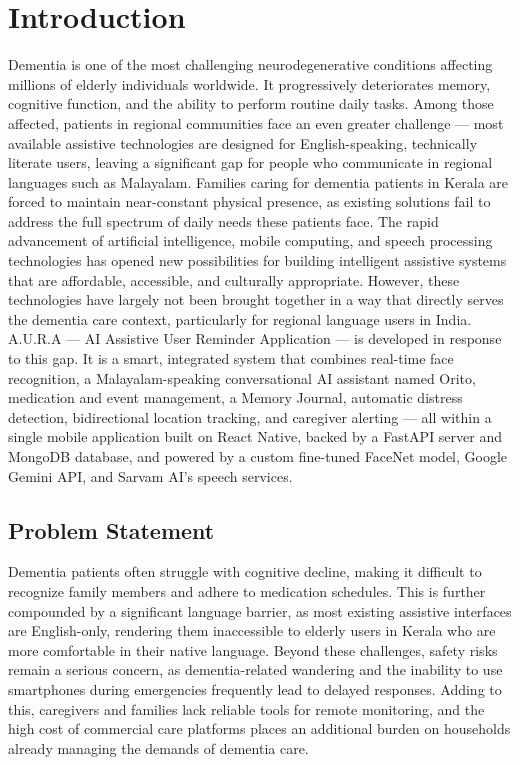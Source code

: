  \setcounter{equation}{0}
\chapter{Introduction}
 Dementia is one of the most challenging neurodegenerative conditions affecting millions of elderly individuals worldwide. It progressively deteriorates memory, cognitive function, and the ability to perform routine daily tasks. Among those affected, patients in regional communities face an even greater challenge — most available assistive technologies are designed for English-speaking, technically literate users, leaving a significant gap for people who communicate in regional languages such as Malayalam. Families caring for dementia patients in Kerala are forced to maintain near-constant physical presence, as existing solutions fail to address the full spectrum of daily needs these patients face.
The rapid advancement of artificial intelligence, mobile computing, and speech processing technologies has opened new possibilities for building intelligent assistive systems that are affordable, accessible, and culturally appropriate. However, these technologies have largely not been brought together in a way that directly serves the dementia care context, particularly for regional language users in India.
A.U.R.A — AI Assistive User Reminder Application — is developed in response to this gap. It is a smart, integrated system that combines real-time face recognition, a Malayalam-speaking conversational AI assistant named Orito, medication and event management, a Memory Journal, automatic distress detection, bidirectional location tracking, and caregiver alerting — all within a single mobile application built on React Native, backed by a FastAPI server and MongoDB database, and powered by a custom fine-tuned FaceNet model, Google Gemini API, and Sarvam AI's speech services.
  \section{ Problem Statement}
  Dementia patients often struggle with cognitive decline, making it difficult to recognize family members and adhere to medication schedules. This is further compounded by a significant language barrier, as most existing assistive interfaces are English-only, rendering them inaccessible to elderly users in Kerala who are more comfortable in their native language. Beyond these challenges, safety risks remain a serious concern, as dementia-related wandering and the inability to use smartphones during emergencies frequently lead to delayed responses. Adding to this, caregivers and families lack reliable tools for remote monitoring, and the high cost of commercial care platforms places an additional burden on households already managing the demands of dementia care.
  


